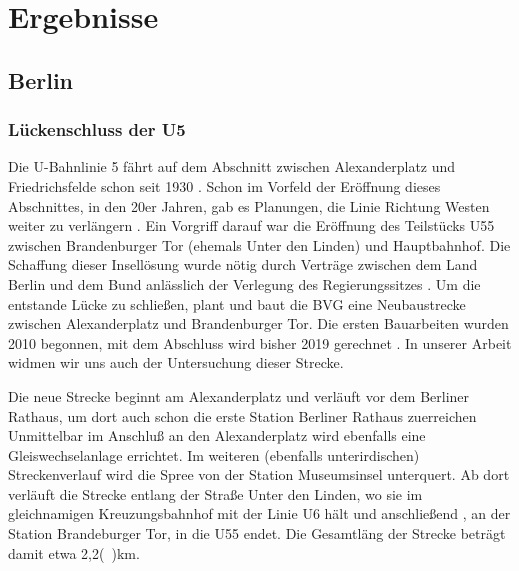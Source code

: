 \chapter{Ergebnisse}

\begin{comment}

Gliederung meiner Streckenbeschreibung (Yves)

* Übersicht
  * Umfeld des Bauprojekts
  * von wo nach wo
  * historische Einordnung

* konkrter Streckenverlauf
* detalierte Daten (weichen etc ..)


* Probleme
  * bautechnisch
  * gesellschaftlich

* Zeitplan

* Kosten
\end{comment}



\section{Berlin}
\subsection*{Lückenschluss der U5}

Die U-Bahnlinie 5 fährt auf dem Abschnitt zwischen Alexanderplatz und
Friedrichsfelde schon seit 1930 \cite{bkhU5}. Schon im Vorfeld der Eröffnung
dieses Abschnittes, in den 20er Jahren, gab es Planungen, die Linie Richtung
Westen weiter zu verlängern \cite{bvgWebsiteU5}. Ein Vorgriff darauf war die
Eröffnung des Teilstücks U55 zwischen Brandenburger Tor (ehemals Unter den
Linden) und Hauptbahnhof. Die Schaffung dieser Insellösung wurde nötig durch
Verträge zwischen dem Land Berlin und dem Bund anlässlich der Verlegung des
Regierungssitzes \cite{hauptstadtvertrag}. Um die entstande Lücke zu schließen,
plant und baut die BVG eine Neubaustrecke zwischen Alexanderplatz und
Brandenburger Tor. Die ersten Bauarbeiten wurden 2010 begonnen, mit dem
Abschluss wird bisher 2019 gerechnet \cite{bvgWebsiteU5plan}. In unserer Arbeit
widmen wir uns auch der Untersuchung dieser Strecke.

Die neue Strecke beginnt am Alexanderplatz und verläuft vor dem Berliner
Rathaus, um dort auch schon die erste Station Berliner Rathaus zuerreichen
\cite{bkhU5} \cite{bvgWebsiteU5} Unmittelbar im Anschluß an den Alexanderplatz
wird ebenfalls eine Gleiswechselanlage errichtet. Im weiteren (ebenfalls
unterirdischen) Streckenverlauf wird die Spree von der Station Museumsinsel
unterquert. Ab dort verläuft die Strecke entlang der Straße Unter den Linden, wo
sie im gleichnamigen Kreuzungsbahnhof mit der Linie U6 hält und anschließend , an
der Station Brandeburger Tor, in die U55 endet. Die Gesamtläng der Strecke
beträgt damit etwa 2,2(\ )km.

